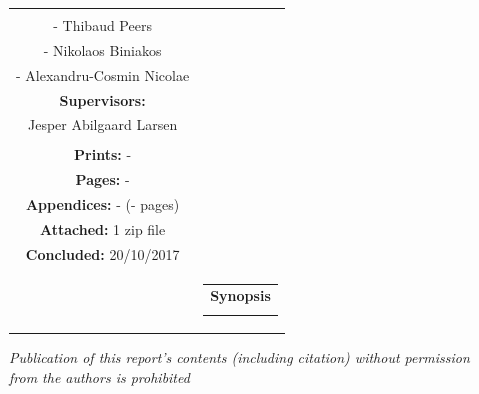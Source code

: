 \begin{nopagebreak}
{\begin{tabular}{cc}
{{\textbf{Participants:}\\
- Thibaud Peers \\
- Nikolaos Biniakos\\
- Alexandru-Cosmin Nicolae\\

\textbf{Supervisors:}\\
Jesper Abilgaard Larsen \\ %
}\\

\textbf{Prints:} -\\
\textbf{Pages:} -\\
\textbf{Appendices:} - (- pages)\\
\textbf{Attached:} 1 zip file\\
\textbf{Concluded:} 20/10/2017\\

\vfill } &
\parbox{7cm}{
  \vspace{.15cm}
  \hfill
  \begin{tabular}{l}
  {\textbf{Synopsis}}\bigskip \\
  \fbox{
    \parbox{6.5cm}{\bigskip
     {\vfill{\small 
     \bigskip}}
     }}
   \end{tabular}}
\end{tabular}} %

\textit{\phantom{A}Publication of this report's contents (including citation) without permission\\ \phantom{A}from the authors is prohibited}\\

\end{nopagebreak}
%